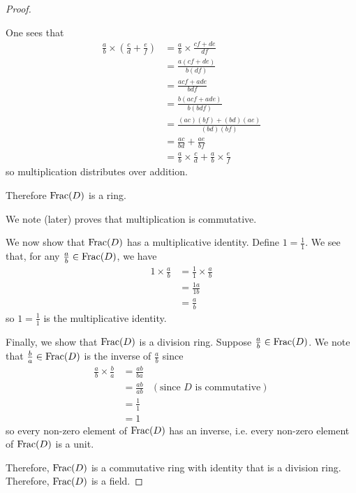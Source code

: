 \begin{proof}
\begin{itemize}
        One sees that
        \begin{align*}
            \frac ab \times \left(\frac cd + \frac ef\right) &= \frac ab \times \frac{cf + de}{df}\\
            &= \frac{a(cf + de)}{b(df)}\\
            &= \frac{acf + ade}{bdf}\\
            &= \frac{b(acf + ade)}{b(bdf)}\\
            &= \frac{(ac)(bf) + (bd)(ae)}{(bd)(bf)}\\
            &= \frac{ac}{bd} + \frac {ae}{bf}\\
            &= \frac ab \times \frac cd + \frac ab \times \frac ef
        \end{align*}
        so multiplication distributes over addition.
    \end{itemize}
    Therefore $\mathrm{Frac}(D)$ is a ring.

    We note  (later) proves that multiplication is commutative.

    We now show that $\mathrm{Frac}(D)$ has a multiplicative identity. Define $1 = \frac 11$. We see that, for any $\frac ab \in \mathrm{Frac}(D)$, we have
    \begin{align*}
        1 \times \frac ab &= \frac 11 \times \frac ab\\
        &= \frac {1a}{1b}\\
        &= \frac ab
    \end{align*}
    so $1 = \frac 11$ is the multiplicative identity.

    Finally, we show that $\mathrm{Frac}(D)$ is a division ring. Suppose $\frac ab \in \mathrm{Frac}(D)$. We note that $\frac ba \in \mathrm{Frac}(D)$ is the inverse of $\frac ab$ since
    \begin{align*}
        \frac ab \times \frac ba &= \frac{ab}{ba}\\
        &= \frac{ab}{ab} & (\text{since } D \text{ is commutative})\\
        &= \frac11\\
        &= 1
    \end{align*}
    so every non-zero element of $\mathrm{Frac}(D)$ has an inverse, i.e. every non-zero element of $\mathrm{Frac}(D)$ is a unit.

    Therefore, $\mathrm{Frac}(D)$ is a commutative ring with identity that is a division ring. Therefore, $\mathrm{Frac}(D)$ is a field.
\end{proof}

